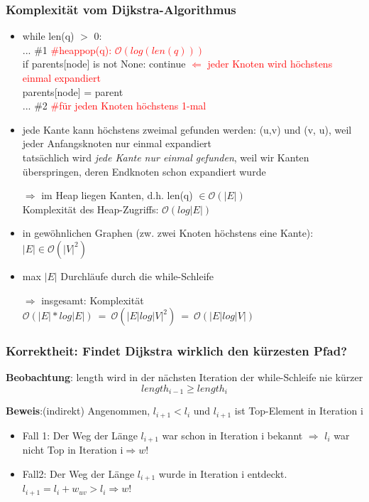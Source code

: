 \documentclass[11pt, fleqn]{scrreprt}
\begin{document}
		\subsubsection*{Komplexität vom Dijkstra-Algorithmus}
		\begin{itemize}
		\item while len(q) $>$ 0: \\
		... \#1 \hspace*{6cm} \textcolor{red}{\#heappop(q): $\mathcal{O}(log(len(q)))$}\\
		if parents[node] is not None: continue \textcolor{red}{$\Leftarrow$ jeder Knoten wird höchstens einmal expandiert}\\
		parents[node] = parent \\
		... \#2\hspace*{6cm}  \textcolor{red}{\#für jeden Knoten höchstens 1-mal}
		\item jede Kante kann höchstens zweimal gefunden werden: (u,v) und (v, u), weil jeder Anfangsknoten nur einmal expandiert \\
		tatsächlich wird \emph{jede Kante nur einmal gefunden}, weil wir Kanten überspringen, deren Endknoten schon expandiert wurde
		\item[$\Rightarrow$] im Heap liegen Kanten, d.h. len(q) $\in \mathcal{O}(|E|)$ \\
		Komplexität des Heap-Zugriffs: \hspace*{0.5cm} $\mathcal{O}(log|E|)$ 
		\item in gewöhnlichen Graphen (zw. zwei Knoten höchstens eine Kante): \hspace*{0.5cm} $|E| \in \mathcal{O}(|V|^2)$
		\item max $|E|$ Durchläufe durch die while-Schleife
		\item[$\Rightarrow$] insgesamt: Komplexität \hspace*{0.5cm} $\mathcal{O}(|E| * log|E|) \ =\  \mathcal{O}(|E| log |V|^2) \ =\  \mathcal{O}(|E| log |V|)$
		\end{itemize}
		
		\subsubsection*{Korrektheit: Findet Dijkstra wirklich den kürzesten Pfad?}
		
		\textbf{Beobachtung}: length wird in der nächsten Iteration der while-Schleife nie kürzer
		\[ length_{i-1} \geq length_i\]
		
		\textbf{Beweis}:(indirekt) Angenommen, $l_{i+1} < l_i$ und $l_{i+1}$ ist Top-Element in Iteration i 
		\begin{itemize}
			\item Fall 1: Der Weg der Länge $l_{i+1}$ war schon in Iteration i bekannt $\Rightarrow$ $l_i$ war nicht Top in Iteration i$\Rightarrow w!$
			\item Fall2: Der Weg der Länge $l_{i+1}$ wurde in Iteration i entdeckt. $l_{i+1} = l_i + w_{uv} > l_i \Rightarrow w!$\\
		\end{itemize}
		
\end{document}
